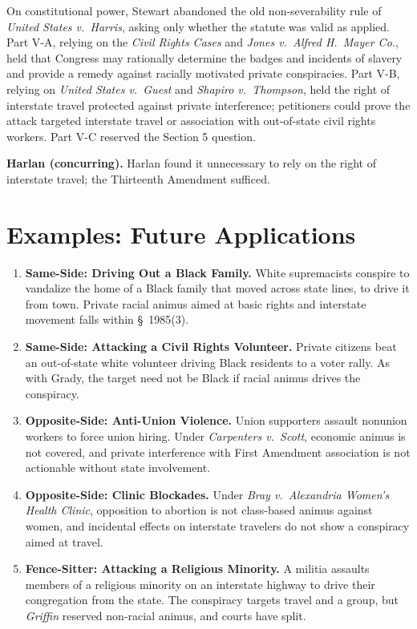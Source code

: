\documentclass[12pt]{article}
\begin{document}
On constitutional power, Stewart abandoned the old non-severability rule of \textit{United States v.\ Harris}, asking only whether the statute was valid as applied. Part V-A, relying on the \textit{Civil Rights Cases} and \textit{Jones v.\ Alfred H.\ Mayer Co.}, held that Congress may rationally determine the badges and incidents of slavery and provide a remedy against racially motivated private conspiracies. Part V-B, relying on \textit{United States v.\ Guest} and \textit{Shapiro v.\ Thompson}, held the right of interstate travel protected against private interference; petitioners could prove the attack targeted interstate travel or association with out-of-state civil rights workers. Part V-C reserved the Section 5 question.

\textbf{Harlan (concurring).} Harlan found it unnecessary to rely on the right of interstate travel; the Thirteenth Amendment sufficed.

\section{Examples: Future Applications}

\begin{enumerate}
\item \textbf{Same-Side: Driving Out a Black Family.} White supremacists conspire to vandalize the home of a Black family that moved across state lines, to drive it from town. Private racial animus aimed at basic rights and interstate movement falls within \S~1985(3).
\item \textbf{Same-Side: Attacking a Civil Rights Volunteer.} Private citizens beat an out-of-state white volunteer driving Black residents to a voter rally. As with Grady, the target need not be Black if racial animus drives the conspiracy.
\item \textbf{Opposite-Side: Anti-Union Violence.} Union supporters assault nonunion workers to force union hiring. Under \textit{Carpenters v.\ Scott}, economic animus is not covered, and private interference with First Amendment association is not actionable without state involvement.
\item \textbf{Opposite-Side: Clinic Blockades.} Under \textit{Bray v.\ Alexandria Women's Health Clinic}, opposition to abortion is not class-based animus against women, and incidental effects on interstate travelers do not show a conspiracy aimed at travel.
\item \textbf{Fence-Sitter: Attacking a Religious Minority.} A militia assaults members of a religious minority on an interstate highway to drive their congregation from the state. The conspiracy targets travel and a group, but \textit{Griffin} reserved non-racial animus, and courts have split.
\end{enumerate}
\end{document}
